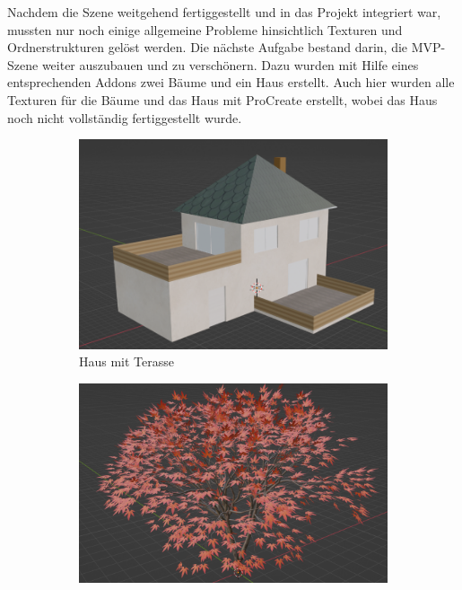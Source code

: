 Nachdem die Szene weitgehend fertiggestellt und in das Projekt integriert war, mussten nur noch einige allgemeine Probleme hinsichtlich Texturen und Ordnerstrukturen gelöst werden.
Die nächste Aufgabe bestand darin, die MVP-Szene weiter auszubauen und zu verschönern. Dazu wurden mit Hilfe eines entsprechenden Addons zwei Bäume und ein Haus erstellt. Auch hier wurden alle Texturen für die Bäume und das Haus mit ProCreate erstellt, wobei das Haus noch nicht vollständig fertiggestellt wurde.
\begin{figure}[H]

	\begin{subfigure}{0.5\textwidth}
		\includegraphics[height=0.3\pageheight,keepaspectratio]{pics/14}
		\caption{Haus mit Terasse}
	\end{subfigure}
	\begin{subfigure}{0.5\textwidth}
		\includegraphics[height=0.3\pageheight,keepaspectratio]{pics/15}

\end{subfigure}
\end{figure}
